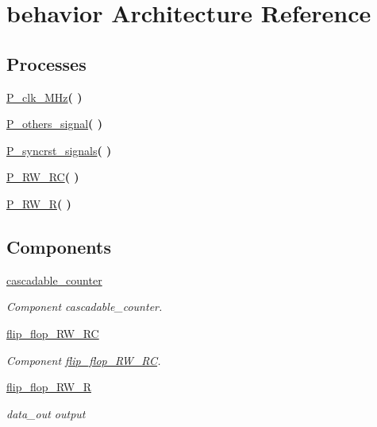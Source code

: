 \hypertarget{classtb__flip__flop_1_1behavior}{}\section{behavior Architecture Reference}
\label{classtb__flip__flop_1_1behavior}
\subsection*{Processes}
 \begin{DoxyCompactItemize}
\item 
\hyperlink{classtb__flip__flop_1_1behavior_a4b6940703ffe261d728114b7c6c439e8}{P\+\_\+clk\+\_\+M\+Hz}{\bfseries  (  )}
\item 
\hyperlink{classtb__flip__flop_1_1behavior_ad9352d7195a550389abc45f562eae289}{P\+\_\+others\+\_\+signal}{\bfseries  (  )}
\item 
\hyperlink{classtb__flip__flop_1_1behavior_a5db205d3a8eaa6843c25e75308a3ad44}{P\+\_\+syncrst\+\_\+signals}{\bfseries  (  )}
\item 
\hyperlink{classtb__flip__flop_1_1behavior_a5c709e94513dcf5547f7569a59f7637f}{P\+\_\+\+R\+W\+\_\+\+RC}{\bfseries  (  )}
\item 
\hyperlink{classtb__flip__flop_1_1behavior_a6ac5b7c5b9ad3b328a74906221be6551}{P\+\_\+\+R\+W\+\_\+R}{\bfseries  (  )}
\end{DoxyCompactItemize}
\subsection*{Components}
 \begin{DoxyCompactItemize}
\item 
\hyperlink{classtb__flip__flop_1_1behavior_a43b32943cff2ea9c75d864730f7a4f8e}{cascadable\+\_\+counter}  {\bfseries }  
\begin{DoxyCompactList}\small\item\em Component cascadable\+\_\+counter. \end{DoxyCompactList}\item 
\hyperlink{classtb__flip__flop_1_1behavior_a62a4e5ce8260b287a2f6fd255c68ba95}{flip\+\_\+flop\+\_\+\+R\+W\+\_\+\+RC}  {\bfseries }  
\begin{DoxyCompactList}\small\item\em Component \hyperlink{classflip__flop___r_w___r_c}{flip\+\_\+flop\+\_\+\+R\+W\+\_\+\+RC}. \end{DoxyCompactList}\item 
\hyperlink{classtb__flip__flop_1_1behavior_aca7bacea666edffdcf025f3ecd49087f}{flip\+\_\+flop\+\_\+\+R\+W\+\_\+R}  {\bfseries }  
\begin{DoxyCompactList}\small\item\em data\+\_\+out output \end{DoxyCompactList}\end{DoxyCompactItemize}
